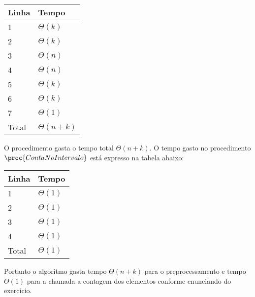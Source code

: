 \begin{table}[H]
\centering
\begin{tabular}{|l|l|}
\hline
Linha                   & Tempo \\ \hline
1 & $\Theta(k)$ \\ \hline
2 & $\Theta(k)$ \\ \hline
3 & $\Theta(n)$ \\ \hline
4 & $\Theta(n)$ \\ \hline
5 & $\Theta(k)$ \\ \hline
6 & $\Theta(k)$ \\ \hline
7 & $\Theta(1)$ \\ \hline
Total & $\Theta(n + k)$ \\ \hline
\end{tabular}
\end{table}
\noindent O procedimento gasta o tempo total $\Theta(n + k)$. O tempo gasto no 
procedimento $\proc{ContaNoIntervalo}$ está expresso na tabela abaixo:
\begin{table}[H]
\centering
\begin{tabular}{|l|l|}
\hline
Linha                   & Tempo \\ \hline
1 & $\Theta(1)$ \\ \hline
2 & $\Theta(1)$ \\ \hline
3 & $\Theta(1)$ \\ \hline
4 & $\Theta(1)$ \\ \hline
Total & $\Theta(1)$ \\ \hline
\end{tabular}
\end{table}
\noindent Portanto o algoritmo gasta tempo $\Theta(n + k)$ para o 
preprocessamento e tempo $\Theta(1)$ para a chamada a contagem dos elementos 
conforme enunciando do exercício.\\[12pt]